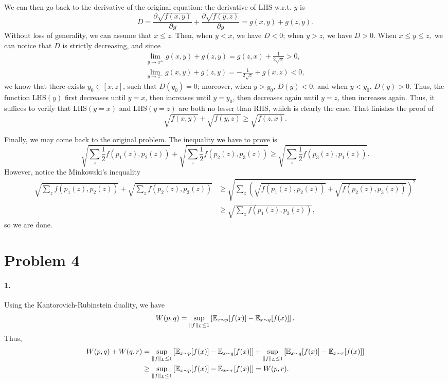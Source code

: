 \documentclass[a4 paper,12pt]{article}
\begin{document}
We can then go back to the derivative of the original equation: the derivative of LHS w.r.t. $y$ is 
\[
D=\frac{\partial \sqrt{f(x,y)}}{\partial y}+\frac{\partial \sqrt{f(y,z)}}{\partial y}=g(x,y)+g(z,y).
\]
Without loss of generality, we can assume that $x\le z$. Then, when $y<x$, we have $D<0$; when $y>z$, we have $D>0$. When $x\le y\le z,$ we can notice that $D$ is strictly decreasing, and since 
\begin{gather*}
\lim_{y\to x^+}g(x,y)+g(z,y)=g(z,x)+\frac{1}{2\sqrt{x}}>0,	\\
\lim_{y\to z^-}g(x,y)+g(z,y)=-\frac{1}{2\sqrt{z}}+g(x,z)<0,
\end{gather*} we know that there exists $y_0\in [x,z]$, such that $D(y_0)=0$; moreover, when $y>y_0$, $D(y)<0$, and when $y<y_0$, $D(y)>0$. Thus, the function LHS$(y)$ first decreases until $y=x$, then increases until $y=y_0$, then decreases again until $y=z$, then increases again. Thus, it suffices to verify that LHS$(y=x)$ and LHS$(y=z)$ are both no lesser than RHS, which is clearly the case. That finishes the proof of 
\[
\sqrt{f(x,y)}+\sqrt{f(y,z)}\ge \sqrt{f(z,x)}.
\]

Finally, we may come back to the original problem. The inequality we have to prove is
\[
\sqrt{\sum_z \frac{1}{2}f(p_1(z),p_2(z))}+\sqrt{\sum_z \frac{1}{2}f(p_2(z),p_3(z))}\ge \sqrt{\sum_z \frac{1}{2}f(p_3(z),p_1(z))}.	
\] However, notice the Minkowski's inequality
\begin{align*}
\sqrt{\sum_z f(p_1(z),p_2(z))}+\sqrt{\sum_z f(p_2(z),p_3(z))}&\ge \sqrt{\sum_z \left(\sqrt{f(p_1(z),p_2(z))}+\sqrt{f(p_2(z),p_3(z))}\right)^2}\\
&\ge \sqrt{\sum_z {f(p_1(z),p_3(z))}},
\end{align*} so we are done.

\section*{Problem 4}

\paragraph*{1.} Using the Kantorovich-Rubinstein duality, we have
\[
W(p,q)=\sup_{\|f\|_L\le 1}\left[\mathbb{E}_{x\sim p}[f(x)]-\mathbb{E}_{x\sim q}[f(x)]\right].	
\]Thus,
\begin{align*}
W(p,q)+W(q,r)&=\sup_{\|f\|_L\le 1}\left[\mathbb{E}_{x\sim p}[f(x)]-\mathbb{E}_{x\sim q}[f(x)]\right]+\sup_{\|f\|_L\le 1}\left[\mathbb{E}_{x\sim q}[f(x)]-\mathbb{E}_{x\sim r}[f(x)]\right]\\
&\ge \sup_{\|f\|_L\le 1}\left[\mathbb{E}_{x\sim p}[f(x)]-\mathbb{E}_{x\sim r}[f(x)]\right]=W(p,r).
\end{align*}
\end{document}
